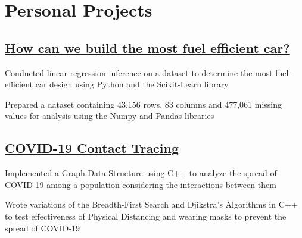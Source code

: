 \documentclass[12pt]{deedy-resume-openfont}
\begin{document}
\begin{minipage}[t] {0.66\textwidth}
\begin{tightemize}
\end{tightemize}
\sectionsep


\section{Personal Projects}
\subsection{ \href{https://tinyurl.com/yyjssdov}{How can we build the most fuel efficient car?}}
\vspace{3mm} %
\begin{tightemize}
\item Conducted linear regression inference on a dataset to determine the most fuel-efficient car design using Python and the Scikit-Learn library
\item Prepared a dataset containing 43,156 rows, 83 columns and 477,061 missing values for analysis using the Numpy and Pandas libraries
\end{tightemize}
\sectionsep
\subsection{\href{https://github.com/arjun-krishna1/Covid-19_contact_tracing}{COVID-19 Contact Tracing}}
\vspace{0.5mm} %
\vspace{1mm} %
\begin{tightemize}
\item Implemented a Graph Data Structure using C++ to analyze the spread of COVID-19 among a population considering the interactions between them
\item Wrote variations of the Breadth-First Search and Djikstra's Algorithms in C++ to test effectiveness of Physical Distancing and wearing masks to prevent the spread of COVID-19
\end{tightemize}
\end{minipage}
\hspace{0.01\textwidth}
\end{document}
